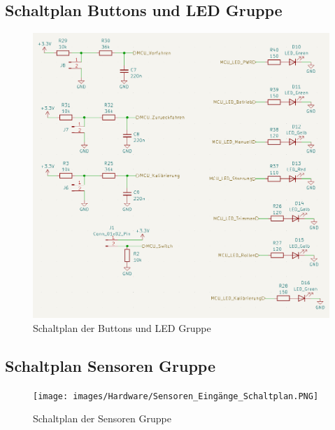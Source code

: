 \subsection{Schaltplan Buttons und LED Gruppe}
\begin{figure}[H]
	\centering
	\includegraphics[width=1.0\textwidth]{images/Hardware/LEDS_und_buttons_schaltplan.PNG}
	\caption{Schaltplan der Buttons und LED Gruppe}
	\label{fig:ButtonGruppe}\begin{center}
	\end{center}
\end{figure}
\subsection{Schaltplan Sensoren Gruppe}
\begin{figure}[H]
	\centering
	\texttt{[image: images/Hardware/Sensoren\_Eingänge\_Schaltplan.PNG]}
	\caption{Schaltplan der Sensoren Gruppe}
	\label{fig:SensorenGruppe}\begin{center}
	\end{center}
\end{figure}
